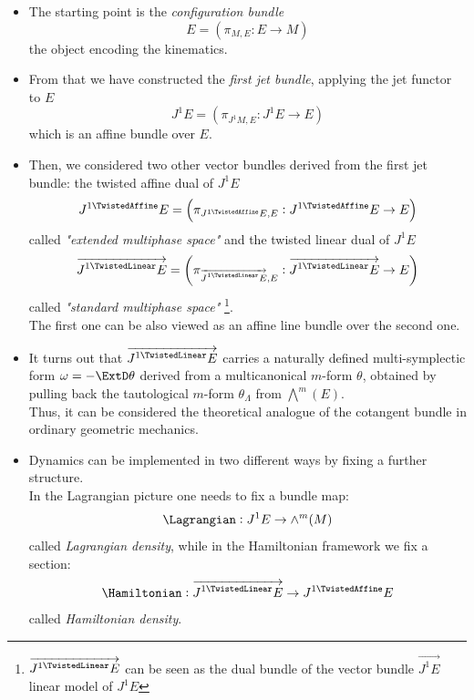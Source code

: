 \documentclass[a4paper,12pt,fleqn]{scrartcl}  %
\renewcommand{\AffDualJet}{ J^{1 \TwistedAffine}E }
\renewcommand{\LinDualJet}{ \overrightarrow{J^{1 \TwistedLinear}E} }
\begin{document}
\begin{itemize}
 \item The starting point is the \emph{configuration bundle} 
 	\begin{displaymath}
 		E = \left( \pi_{M,E} : E\rightarrow M \right)
 	\end{displaymath}
 	the object encoding the kinematics.
 \item From that we have constructed the \emph{first jet bundle}, applying the jet functor to $E$ 
 	\begin{displaymath}
 	J^1E = \left( \pi_{J^1 M,E} : J^1 E\rightarrow E \right)
 	\end{displaymath} 
 	which is an affine bundle over $E$.
 \item Then, we considered two other vector bundles derived from the first jet bundle: 
 	the twisted affine dual of $J^1E$ 
 	\begin{displaymath}
 	\AffDualJet  = \left( \pi_{ \AffDualJet ,E} : \AffDualJet  \rightarrow E \right)
 	\end{displaymath}
 	called \emph{"extended multiphase space"} and the twisted linear dual of $J^1 E$
	\begin{displaymath}
		\LinDualJet  = \left( \pi_{ \LinDualJet ,E} : \LinDualJet \rightarrow E \right)
	\end{displaymath}
	called \emph{"standard multiphase space"} \footnote{$\LinDualJet$ can be seen as the dual bundle of the vector bundle $\vec{J^1E}$ linear model of $J^1E$}.\\
	The first one can be also viewed as an affine line bundle over the second one.
	
\item It turns out that  $\LinDualJet $ carries a naturally defined multi-symplectic form $\omega = -\ExtD \theta$ derived from a multicanonical $m$-form $\theta$, obtained by pulling back the tautological $m$-form $\theta_\Lambda$ from $\bigwedge^m (E)$.\\
	Thus, it can be considered the theoretical analogue of the cotangent bundle in ordinary geometric mechanics.
	
\item Dynamics can be implemented in two different ways by fixing a further structure.\\
	In the Lagrangian picture one needs to fix a bundle map:
	\begin{displaymath}
		\Lagrangian : J^1 E \rightarrow \wedge^m (M)
	\end{displaymath}
	called \emph{Lagrangian density}, 	while in the Hamiltonian framework we fix a section:
	\begin{displaymath}
		\Hamiltonian : \LinDualJet \rightarrow \AffDualJet
	\end{displaymath}
	called \emph{Hamiltonian density}.


\end{itemize}
\end{document}
